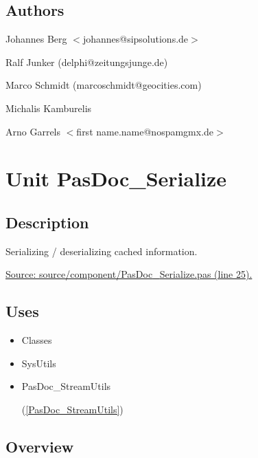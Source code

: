 \documentclass{report}
\begin{document}
\section{Authors}
\par
Johannes Berg {$<$}johannes@sipsolutions.de{$>$}

\par
Ralf Junker (delphi@zeitungsjunge.de)

\par
Marco Schmidt (marcoschmidt@geocities.com)

\par
Michalis Kamburelis

\par
Arno Garrels {$<$}first name.name@nospamgmx.de{$>$}

\chapter{Unit PasDoc{\_}Serialize}
\label{PasDoc_Serialize}
\section{Description}
Serializing / deserializing cached information.\hfill\vspace*{1ex}

 \par
\href{https://github.com/pasdoc/pasdoc/blob/master/source/component/PasDoc_Serialize.pas#L25}{Source: source/component/PasDoc{\_}Serialize.pas (line 25).}
\section{Uses}
\begin{itemize}
\item \begin{ttfamily}Classes\end{ttfamily}\item \begin{ttfamily}SysUtils\end{ttfamily}\item \begin{ttfamily}PasDoc{\_}StreamUtils\end{ttfamily}(\ref{PasDoc_StreamUtils})\end{itemize}
\section{Overview}
\begin{description}
\item[\texttt{\begin{ttfamily}EInvalidCacheFileVersion\end{ttfamily} Class}]
\item[\texttt{\begin{ttfamily}TSerializable\end{ttfamily} Class}]
\item[\texttt{\begin{ttfamily}ESerializedException\end{ttfamily} Class}]
\end{description}
\end{document}
